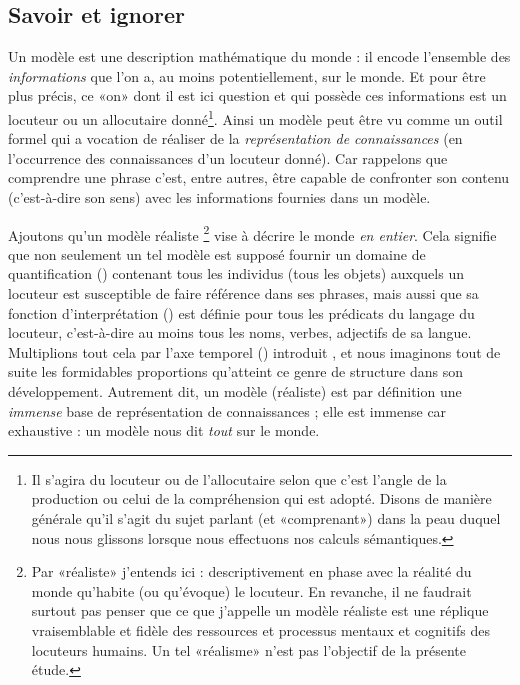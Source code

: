 \subsection{Savoir et ignorer}
\label{s:savoir&ignorer}

Un modèle est une description mathématique
du monde : il encode l'ensemble des \emph{informations} que l'on a, au
moins potentiellement, sur le monde.  Et pour être plus précis, ce
«on» dont il est ici question et qui possède ces informations est
un locuteur ou un allocutaire donné\footnote{Il s'agira du locuteur
  ou de l'allocutaire selon que c'est l'angle de la
  production ou celui de la compréhension qui est adopté.  Disons de
  manière générale qu'il s'agit du sujet parlant (et «comprenant») dans la
  peau duquel nous nous glissons lorsque nous effectuons nos calculs sémantiques.}.  Ainsi
un modèle peut être vu comme un outil 
formel qui a vocation de réaliser de la \emph{représentation de
connaissances} (en l'occurrence des connaissances d'un locuteur
donné).  Car rappelons que comprendre une phrase c'est, entre autres,
être capable de confronter son contenu (c'est-à-dire son sens) avec
les informations fournies dans un modèle.


Ajoutons qu'un modèle réaliste%
\footnote{Par «réaliste» j'entends ici : descriptivement en phase
avec la réalité du monde qu'habite (ou qu'évoque) le locuteur.  En
revanche, il ne faudrait surtout pas penser que ce que j'appelle un
modèle réaliste est une réplique vraisemblable et fidèle des
ressources et processus mentaux et cognitifs des locuteurs humains. Un
tel «réalisme» n'est pas l'objectif de la présente étude.}  
vise à décrire le monde \emph{en entier}.  Cela signifie que non
seulement un tel modèle est supposé fournir un domaine de
quantification () contenant tous les individus (tous les
objets) auxquels un locuteur est susceptible de faire référence dans
ses phrases, mais aussi que sa fonction d'interprétation (\FI) est
définie pour tous les prédicats du langage du locuteur, c'est-à-dire
au moins tous les noms, verbes, adjectifs de sa langue. 
Multiplions tout cela par l'axe temporel (\Tps) introduit
, et nous imaginons tout de suite les formidables
proportions qu'atteint ce genre de structure dans son développement.
Autrement dit, un modèle (réaliste) est par définition %
une \emph{immense}  base de représentation de connaissances
; elle est immense car exhaustive : un modèle nous dit \emph{tout}
sur le monde.


